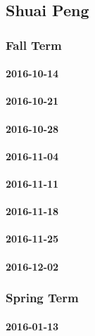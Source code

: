 \subsection{Shuai Peng}

\subsubsection{Fall Term}

\paragraph{2016-10-14}

\paragraph{2016-10-21}

\paragraph{2016-10-28}

\paragraph{2016-11-04}

\paragraph{2016-11-11}

\paragraph{2016-11-18}

\paragraph{2016-11-25}

\paragraph{2016-12-02}

\subsubsection{Spring Term}

\paragraph{2016-01-13}

